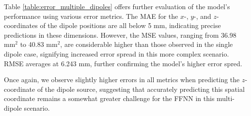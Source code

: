 \documentclass[a4paper, UKenglish, 11pt]{uiomaster}
\begin{document}
Table \ref{table:error_multiple_dipoles} offers further evaluation of the model's performance using various error metrics. The MAE for the $x$-, $y$-, and $z$-coordinates of the dipole positions are all below 5 mm, indicating precise predictions in these dimensions. However, the MSE values, ranging from 36.98 mm$^2$ to 40.83 mm$^2$, are considerable higher than those observed in the single dipole case, signifying increased error spread in this more complex scenario. RMSE averages at 6.243 mm, further confirming the model's higher error spred.

Once again, we observe slightly higher errors in all metrics when predicting the $z$-coordinate of the dipole source, suggesting that accurately predicting this spatial coordinate remains a somewhat greater challenge for the FFNN in this multi-dipole scenario.
\end{document}
